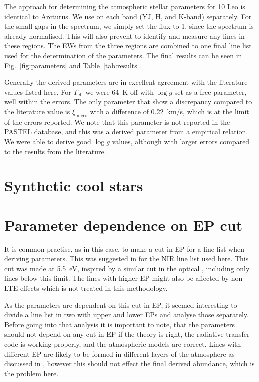 The approach for determining the atmospheric stellar parameters for 10 Leo is identical to Arcturus.
We use \ARES on each band (YJ, H, and K-band) separately. For the small gaps in the spectrum, we
simply set the flux to 1, since the spectrum is already normalised. This will also prevent \ARES to
identify and measure any lines in these regions. The EWs from the three regions are combined to one
final line list used for the determination of the parameters. The final results can be seen in
Fig.~\ref{fig:parameters} and Table~\ref{tab:results}.

Generally the derived parameters are in excellent agreement with the literature values listed here.
For $T_\mathrm{eff}$ we were \SI{64}{K} off with $\log g$ set as a free parameter, well within the
errors. The only parameter that show a discrepancy compared to the literature value is
$\xi_\mathrm{micro}$ with a difference of \SI{0.22}{km/s}, which is at the limit of the errors
reported. We note that this parameter is not reported in the PASTEL database, and this was a derived
parameter from a empirical relation. We were able to derive good $\log g$ values, although with
larger errors compared to the results from the literature.


\section{Synthetic cool stars}
\label{sec:synthetic_spectra}



\section{Parameter dependence on EP cut}
\label{sec:EPcut}

It is common practise, as in this case, to make a cut in EP for a line list when deriving
parameters. This was suggested in \citet{Andreasen2016} \citep[later done in][]{Andreasen2017b} for
the NIR line list used here. This cut was made at \SI{5.5}{eV}, inspired by a similar cut in the
optical \citep{Sousa2008a}, including only lines below this limit. The lines with higher EP might
also be affected by non-LTE effects which is not treated in this methodology.

As the parameters are dependent on this cut in EP, it
seemed interesting to divide a line list in two with upper and lower EPs and analyse those
separately. Before going into that analysis it is important to note, that the parameters should not
depend on any cut in EP if the theory is right, the radiative transfer code is working properly, and
the atmospheric models are correct. Lines with different EP are likely to be formed in different
layers of the atmosphere as discussed in , however this should not
effect the final derived abundance, which is the problem here.
